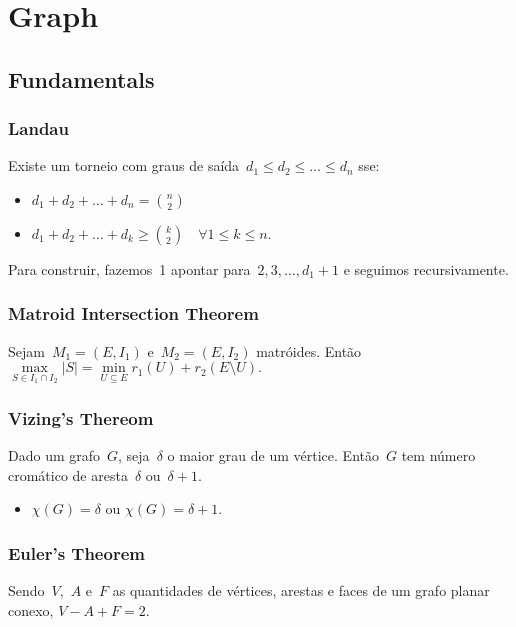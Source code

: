 \chapter{Graph}

\section{Fundamentals}
    \newline
    \newline
    
    \subsection{Landau}
            Existe um torneio com graus de saída~$d_1 \leq d_2 \leq \ldots \leq d_n$ sse:
            \begin{itemize}
            \item $d_1 + d_2 + \ldots + d_n = {n \choose 2}$
            \item $d_1 + d_2 + \ldots + d_k \geq {k \choose 2} \quad \forall 1 \leq k \leq n.$
            \end{itemize}
            Para construir, fazemos~1 apontar para~$2, 3, \ldots, d_1 + 1$ e seguimos recursivamente.
 
    \subsection{Matroid Intersection Theorem}
        Sejam~$M_1 = (E, I_1)$ e~$M_2 = (E, I_2)$ matróides. Então
        $ \max\limits_{S \in I_1 \cap I_2}{|S|} = \min\limits_{U \subseteq E}{r_1(U) + r_2(E \setminus U)}. $

    \subsection{Vizing's Thereom}
        Dado um grafo~$G$, seja~$\delta$ o maior grau de um vértice. Então~$G$ tem número cromático de aresta~$\delta$ ou~$\delta + 1$.
        \begin{itemize}
        \item $\chi(G) = \delta $ ou $\chi(G) = \delta + 1$.
        \end{itemize}	
       
    \subsection{Euler's Theorem}
    Sendo~$V$,~$A$ e~$F$ as quantidades de vértices, arestas e faces de um grafo planar conexo,
    $ V - A + F = 2 $.

